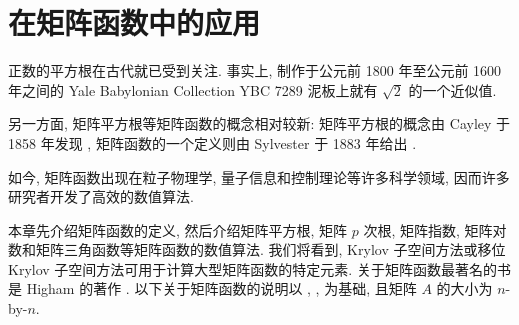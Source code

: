 \clearpage\section{{在矩阵函数中的应用}}\label{chap:matrix-functions}
\setcounter{footnote}{0}

{正数的平方根在古代就已受到关注. 事实上, 制作于公元前 1800 年至公元前 1600 年之间的 Yale Babylonian Collection YBC 7289 泥板上就有 $\sqrt{2}$ 的一个近似值.}

{另一方面, 矩阵平方根等矩阵函数的概念相对较新: 矩阵平方根的概念由 Cayley 于 1858 年发现 , 矩阵函数的一个定义则由 Sylvester 于 1883 年给出 .}

{如今, 矩阵函数出现在粒子物理学, 量子信息和控制理论等许多科学领域, 因而许多研究者开发了高效的数值算法.}

{本章先介绍矩阵函数的定义, 然后介绍矩阵平方根, 矩阵 $p$ 次根, 矩阵指数, 矩阵对数和矩阵三角函数等矩阵函数的数值算法. 我们将看到, Krylov 子空间方法或移位 Krylov 子空间方法可用于计算大型矩阵函数的特定元素. 关于矩阵函数最著名的书是 Higham 的著作 . 以下关于矩阵函数的说明以 , ,  为基础, 且矩阵 $A$ 的大小为 $n$-by-$n$.}
